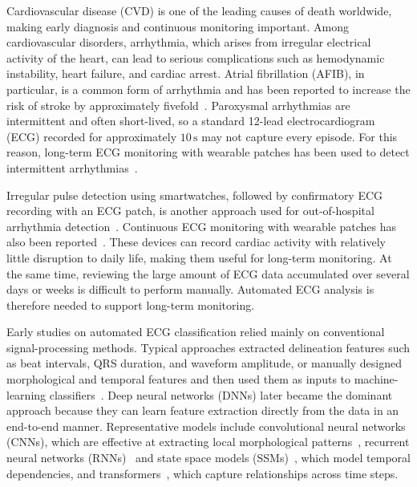 Cardiovascular disease (CVD) is one of the leading causes of death worldwide, making early diagnosis and continuous monitoring important.
Among cardiovascular disorders, arrhythmia, which arises from irregular electrical activity of the heart, can lead to serious complications such as hemodynamic instability, heart failure, and cardiac arrest.
Atrial fibrillation (AFIB), in particular, is a common form of arrhythmia and has been reported to increase the risk of stroke by approximately fivefold~\cite{wolf1991atrial}.
Paroxysmal arrhythmias are intermittent and often short-lived, so a standard 12-lead electrocardiogram (ECG) recorded for approximately $10\,\mathrm{s}$ may not capture every episode.
For this reason, long-term ECG monitoring with wearable patches has been used to detect intermittent arrhythmias~\cite{steinhubl2018wearable}.

Irregular pulse detection using smartwatches, followed by confirmatory ECG recording with an ECG patch, is another approach used for out-of-hospital arrhythmia detection~\cite{perez2019large}.
Continuous ECG monitoring with wearable patches has also been reported~\cite{steinhubl2018wearable}.
These devices can record cardiac activity with relatively little disruption to daily life, making them useful for long-term monitoring.
At the same time, reviewing the large amount of ECG data accumulated over several days or weeks is difficult to perform manually.
Automated ECG analysis is therefore needed to support long-term monitoring.

Early studies on automated ECG classification relied mainly on conventional signal-processing methods.
Typical approaches extracted delineation features such as beat intervals, QRS duration, and waveform amplitude, or manually designed morphological and temporal features and then used them as inputs to machine-learning classifiers~\cite{de2004automatic,melgani2008classification,luz2016ecg,raj2017ecg}.
Deep neural networks (DNNs) later became the dominant approach because they can learn feature extraction directly from the data in an end-to-end manner.
Representative models include convolutional neural networks (CNNs), which are effective at extracting local morphological patterns~\cite{niu2019inter,jing2021ecg}, recurrent neural networks (RNNs)~\cite{saadatnejad2019lstm,hou2019lstm} and state space models (SSMs)~\cite{lee2025atrial,bathini2026mamba}, which model temporal dependencies, and transformers~\cite{islam2024cat,che2021constrained}, which capture relationships across time steps.

